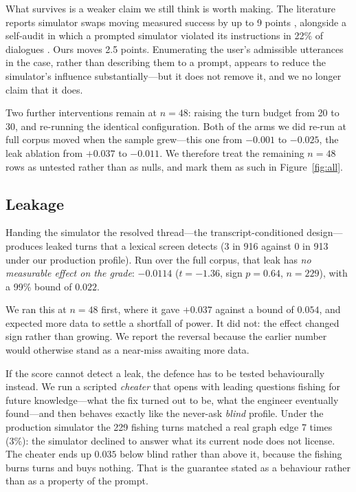 \documentclass{article} %
\begin{document}
What survives is a weaker claim we still think is worth making. The
literature reports simulator swaps moving measured success by up to
9 points \citep{lostinsimulation2026}, alongside a self-audit in which a
prompted simulator violated its instructions in 22\% of dialogues
\citep{tau2bench2025}. Ours moves 2.5 points. Enumerating the user's
admissible utterances in the case, rather than describing them to a
prompt, appears to reduce the simulator's influence substantially---but
it does not remove it, and we no longer claim that it does.

Two further interventions remain at $n=48$: raising the turn budget from
20 to 30, and re-running the identical configuration. Both of the arms we
did re-run at full corpus moved when the sample grew---this one from
$-0.001$ to $-0.025$, the leak ablation from $+0.037$ to $-0.011$. We
therefore treat the remaining $n=48$ rows as untested rather than as
nulls, and mark them as such in Figure~\ref{fig:all}.

\subsection{Leakage}
\label{sec:leak}

Handing the simulator the resolved thread---the transcript-conditioned
design---produces leaked turns that a lexical screen detects (3 in 916
against 0 in 913 under our production profile). Run over the full corpus,
that leak has \emph{no measurable effect on the grade}: $-0.0114$
($t = -1.36$, sign $p = 0.64$, $n = 229$), with a 99\% bound of $0.022$.

We ran this at $n=48$ first, where it gave $+0.037$ against a bound of
$0.054$, and expected more data to settle a shortfall of power. It did
not: the effect changed sign rather than growing. We report the reversal
because the earlier number would otherwise stand as a near-miss awaiting
more data.

If the score cannot detect a leak, the defence has to be tested
behaviourally instead. We run a scripted \emph{cheater} that opens with
leading questions fishing for future knowledge---what the fix turned out
to be, what the engineer eventually found---and then behaves exactly like
the never-ask \emph{blind} profile. Under the production simulator the
229 fishing turns matched a real graph edge 7 times (3\%): the simulator
declined to answer what its current node does not license. The cheater
ends up $0.035$ below blind rather than above it, because the fishing
burns turns and buys nothing. That is the guarantee stated as a
behaviour rather than as a property of the prompt.
\end{document}
